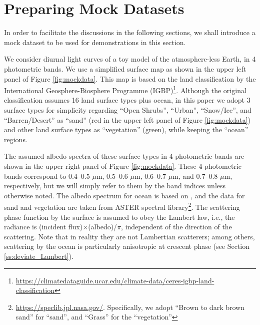 \documentclass[iop,numberedappendix,apj]{emulateapj}
\def\memoJLY#1{\color{green}[JLY: {\bf #1}]\color{black}}
\begin{document}
\section{Preparing Mock Datasets}
\label{s:mockdata}

In order to facilitate the discussions in the following sections, we shall introduce a mock dataset to be used for demonstrations in this section. 

We consider diurnal light curves of a toy model of the atmosphere-less Earth, in 4 photometric bands. 
We use a simplified surface map as shown in the upper left panel of Figure \ref{fig:mockdata}. 
This map is based on the land classification by the International Geosphere-Biosphere Programme (IGBP)\footnote{\url{https://climatedataguide.ucar.edu/climate-data/ceres-igbp-land-classification}}. 
Although the original classification assumes 16 land surface types plus ocean, in this paper we adopt 3 surface types for simplicity regarding ``Open Shrubs'', ``Urban'', ``Snow/Ice'', and ``Barren/Desert'' as ``sand'' (red in the upper left panel of Figure \ref{fig:mockdata}) and other land surface types as ``vegetation'' (green), while keeping the ``ocean'' regions. 


The assumed albedo spectra of these surface types in 4 photometric bands are shown in the upper right panel of Figure \ref{fig:mockdata}. 
These 4 photometric bands correspond to 0.4--0.5 $\mu $m, 0.5--0.6 $\mu $m, 0.6--0.7 $\mu $m, and 0.7--0.8 $\mu $m, respectively, but we will simply refer to them by the band indices unless otherwise noted. 
The albedo spectrum for ocean is based on \citet{Mclinden1997}, 
and the data for sand and vegetation are taken from ASTER spectral library\footnote{\url{https://speclib.jpl.nasa.gov/}. 
Specifically, we adopt  ``Brown to dark brown sand'' for ``sand'', and ``Grass'' for the ``vegetation''}. 
The scattering phase function by the surface is assumed to obey the Lambert law, i.e., the radiance is (incident flux)$\times $(albedo)/$\pi$, independent of the direction of the scattering. 
Note that in reality they are not Lambertian scatterers; among others,  scattering by the ocean is particularly anisotropic at crescent phase (see Section \ref{ss:deviate_Lambert}).  
\end{document}
